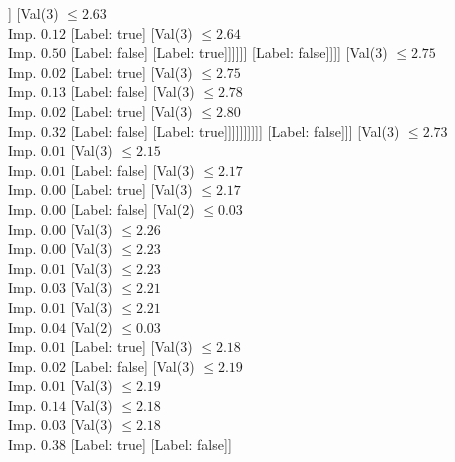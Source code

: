 \documentclass[margin=10pt]{standalone}
\begin{document}
\begin{forest}
																				]
																			[Val($3$) $ \leq 2.63$ \\ Imp. $0.12$
																				[Label: true]
																				[Val($3$) $ \leq 2.64$ \\ Imp. $0.50$
																					[Label: false]
																					[Label: true]]]]]]
																[Label: false]]]]
													[Val($3$) $ \leq 2.75$ \\ Imp. $0.02$
														[Label: true]
														[Val($3$) $ \leq 2.75$ \\ Imp. $0.13$
															[Label: false]
															[Val($3$) $ \leq 2.78$ \\ Imp. $0.02$
																[Label: true]
																[Val($3$) $ \leq 2.80$ \\ Imp. $0.32$
																	[Label: false]
																	[Label: true]]]]]]]]]]
								[Label: false]]]
						[Val($3$) $ \leq 2.73$ \\ Imp. $0.01$
							[Val($3$) $ \leq 2.15$ \\ Imp. $0.01$
								[Label: false]
								[Val($3$) $ \leq 2.17$ \\ Imp. $0.00$
									[Label: true]
									[Val($3$) $ \leq 2.17$ \\ Imp. $0.00$
										[Label: false]
										[Val($2$) $ \leq 0.03$ \\ Imp. $0.00$
											[Val($3$) $ \leq 2.26$ \\ Imp. $0.00$
												[Val($3$) $ \leq 2.23$ \\ Imp. $0.01$
													[Val($3$) $ \leq 2.23$ \\ Imp. $0.03$
														[Val($3$) $ \leq 2.21$ \\ Imp. $0.01$
															[Val($3$) $ \leq 2.21$ \\ Imp. $0.04$
																[Val($2$) $ \leq 0.03$ \\ Imp. $0.01$
																	[Label: true]
																	[Val($3$) $ \leq 2.18$ \\ Imp. $0.02$
																		[Label: false]
																		[Val($3$) $ \leq 2.19$ \\ Imp. $0.01$
																			[Val($3$) $ \leq 2.19$ \\ Imp. $0.14$
																				[Val($3$) $ \leq 2.18$ \\ Imp. $0.03$
																					[Val($3$) $ \leq 2.18$ \\ Imp. $0.38$
																						[Label: true]
																						[Label: false]]

\end{forest}
\end{document}
